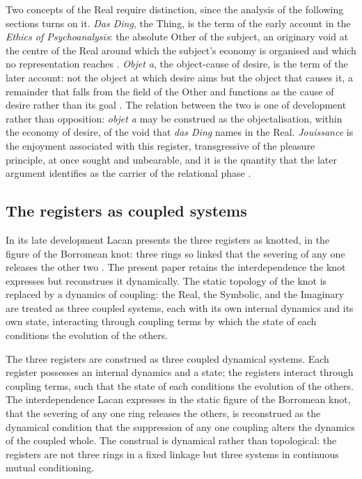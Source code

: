 Two concepts of the Real require distinction, since the analysis of the following sections turns on it. \emph{Das Ding}, the Thing, is the term of the early account in the \emph{Ethics of Psychoanalysis}: the absolute Other of the subject, an originary void at the centre of the Real around which the subject's economy is organised and which no representation reaches \parencite{lacan1992}. \emph{Objet a}, the object-cause of desire, is the term of the later account: not the object at which desire aims but the object that causes it, a remainder that falls from the field of the Other and functions as the cause of desire rather than its goal \parencite{lacan1978sem11,fink1995}. The relation between the two is one of development rather than opposition: \emph{objet a} may be construed as the objectalisation, within the economy of desire, of the void that \emph{das Ding} names in the Real. \emph{Jouissance} is the enjoyment associated with this register, transgressive of the pleasure principle, at once sought and unbearable, and it is the quantity that the later argument identifies as the carrier of the relational phase \parencite{lacan1998,fink1995}.

\subsection{The registers as coupled systems}
\label{p10:sec:coupled}

In its late development Lacan presents the three registers as knotted, in the figure of the Borromean knot: three rings so linked that the severing of any one releases the other two \parencite{lacan1998,evans1996}. The present paper retains the interdependence the knot expresses but reconstrues it dynamically. The static topology of the knot is replaced by a dynamics of coupling: the Real, the Symbolic, and the Imaginary are treated as three coupled systems, each with its own internal dynamics and its own state, interacting through coupling terms by which the state of each conditions the evolution of the others.

\begin{claim}
The three registers are construed as three coupled dynamical systems. Each register possesses an internal dynamics and a state; the registers interact through coupling terms, such that the state of each conditions the evolution of the others. The interdependence Lacan expresses in the static figure of the Borromean knot, that the severing of any one ring releases the others, is reconstrued as the dynamical condition that the suppression of any one coupling alters the dynamics of the coupled whole. The construal is dynamical rather than topological: the registers are not three rings in a fixed linkage but three systems in continuous mutual conditioning.
\end{claim}

